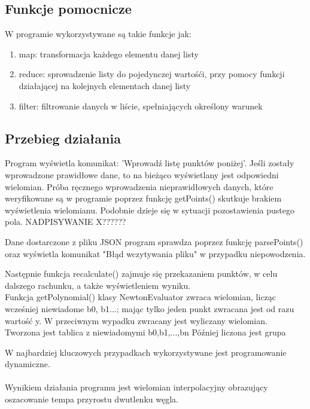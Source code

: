 \documentclass[12pt]{article}
\begin{document}
\subsection{Funkcje pomocnicze}

W programie wykorzystywane są takie funkcje jak:
\begin{enumerate}
\item map: transformacja każdego elementu danej listy 
\item reduce: sprowadzenie listy do pojedynczej wartośći, przy pomocy funkcji działającej na kolejnych elementach danej listy 
\item filter: filtrowanie danych w liście, spełniających określony warunek
\end{enumerate}
\subsection{Przebieg działania}
Program wyświetla komunikat: 'Wprowadź listę punktów poniżej'. Jeśli zostały wprowadzone prawidłowe dane, to na bieżąco wyświetlany jest odpowiedni wielomian. 
Próba ręcznego wprowadzenia nieprawidłowych danych, które weryfikowane są w programie poprzez funkcję getPoints() skutkuje brakiem wyświetlenia wielomianu. Podobnie dzieje się w sytuacji pozostawienia pustego pola.
NADPISYWANIE X??????
\par Dane dostarczone z pliku JSON program sprawdza poprzez funkcję parsePoints() oraz wyświetla komunikat "Błąd wczytywania pliku" w przypadku niepowodzenia.\\
\par Następnie funkcja recalculate() zajmuje się przekazaniem punktów, w celu dalszego rachunku, a także wyświetleniem wyniku.\\
Funkcja getPolynomial() klasy NewtonEvaluator zwraca wielomian, licząc wcześniej niewiadome b0, b1...; mając tylko jeden punkt zwracana jest od razu wartość y. W przeciwnym wypadku zwracany jest wyliczany wielomian. 
\\
Tworzona jest tablica z niewiadomymi b0,b1,...,bn
Później liczona jest grupa 




W najbardziej kluczowych przypadkach wykorzystywane jest programowanie dynamiczne.
\\ \\
Wynikiem działania programu jest wielomian interpolacyjny obrazujący oszacowanie tempa przyrostu dwutlenku węgla.
\end{document}
